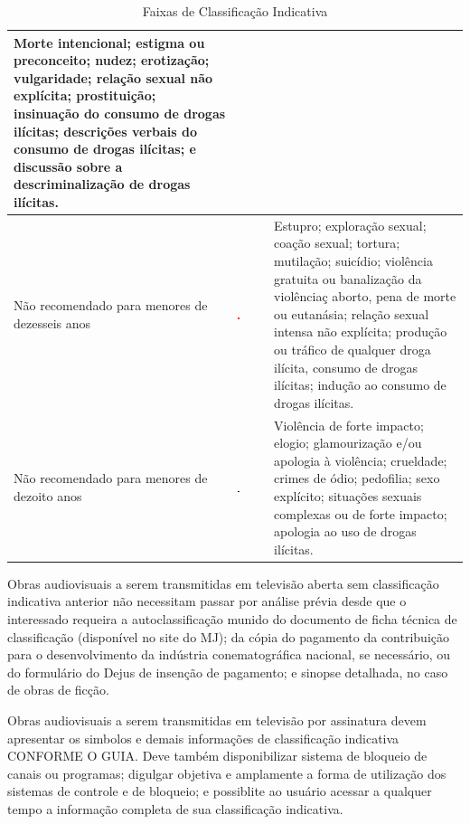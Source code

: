 \begin{table}[h!]
\begin{tabular}{p{3cm} p{2cm} p{9cm}}
				Morte intencional; estigma ou preconceito; nudez; erotização; vulgaridade; relação sexual não explícita; prostituição; insinuação do consumo de drogas ilícitas; descrições verbais do 	consumo de drogas ilícitas; e discussão sobre a descriminalização de drogas ilícitas.\\
		\hline
		Não recomendado para menores de dezesseis anos & \includegraphics[width=0.05\textwidth]{img/16anos.png} &
				Estupro; exploração sexual; coação sexual; tortura; mutilação; suicídio; violência gratuita ou banalização da violênciaç aborto, pena de morte ou eutanásia; relação sexual intensa não explícita; produção ou tráfico de qualquer droga ilícita, consumo de drogas ilícitas; indução ao consumo de drogas ilícitas.\\
		\hline
		Não recomendado para menores de dezoito anos & \includegraphics[width=0.05\textwidth]{img/18anos.png} &
				Violência de forte impacto; elogio; glamourização e/ou apologia à violência; crueldade; crimes de ódio; pedofilia; sexo explícito; situações sexuais complexas ou de forte impacto; apologia ao uso de drogas ilícitas.\\
		\hline
	\end{tabular}
	\caption{Faixas de Classificação Indicativa}
	\label{tab:categorias}
\end{table}


Obras audiovisuais a serem transmitidas em televisão aberta sem classificação indicativa anterior não necessitam passar por análise prévia desde que o interessado requeira a autoclassificação munido do documento de ficha técnica de classificação (disponível no site do MJ); da cópia do pagamento da contribuição para o desenvolvimento da indústria conematográfica nacional, se necessário, ou do formulário do Dejus de insenção de pagamento; e sinopse detalhada, no caso de obras de ficção.

Obras audiovisuais a serem transmitidas em televisão por assinatura devem apresentar os simbolos e demais informações de classificação indicativa CONFORME O GUIA. Deve também disponibilizar sistema de bloqueio de canais ou programas; digulgar objetiva e amplamente a forma de utilização dos sistemas de controle e de bloqueio; e possiblite ao usuário acessar a qualquer tempo a informação completa de sua classificação indicativa.
